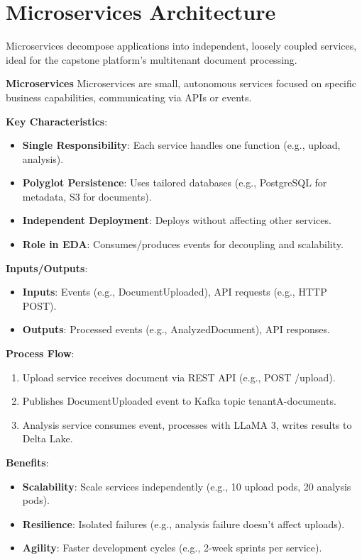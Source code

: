 \documentclass[11pt]{article}
\begin{document}
\tableofcontents
\newpage

\section{Microservices Architecture}
Microservices decompose applications into independent, loosely coupled services, ideal for the capstone platform’s multitenant document processing.

\begin{glossaryterm}
\textbf{Microservices}\newline
Microservices are small, autonomous services focused on specific business capabilities, communicating via APIs or events.

\textbf{Key Characteristics}:
\begin{itemize}
    \item \textbf{Single Responsibility}: Each service handles one function (e.g., upload, analysis).
    \item \textbf{Polyglot Persistence}: Uses tailored databases (e.g., PostgreSQL for metadata, S3 for documents).
    \item \textbf{Independent Deployment}: Deploys without affecting other services.
    \item \textbf{Role in EDA}: Consumes/produces events for decoupling and scalability.
\end{itemize}

\textbf{Inputs/Outputs}:
\begin{itemize}
    \item \textbf{Inputs}: Events (e.g., DocumentUploaded), API requests (e.g., HTTP POST).
    \item \textbf{Outputs}: Processed events (e.g., AnalyzedDocument), API responses.
\end{itemize}

\textbf{Process Flow}:
\begin{enumerate}
    \item Upload service receives document via REST API (e.g., POST /upload).
    \item Publishes DocumentUploaded event to Kafka topic tenantA-documents.
    \item Analysis service consumes event, processes with LLaMA 3, writes results to Delta Lake.
\end{enumerate}

\textbf{Benefits}:
\begin{itemize}
    \item \textbf{Scalability}: Scale services independently (e.g., 10 upload pods, 20 analysis pods).
    \item \textbf{Resilience}: Isolated failures (e.g., analysis failure doesn’t affect uploads).
    \item \textbf{Agility}: Faster development cycles (e.g., 2-week sprints per service).
\end{itemize}


\end{glossaryterm}
\end{document}

